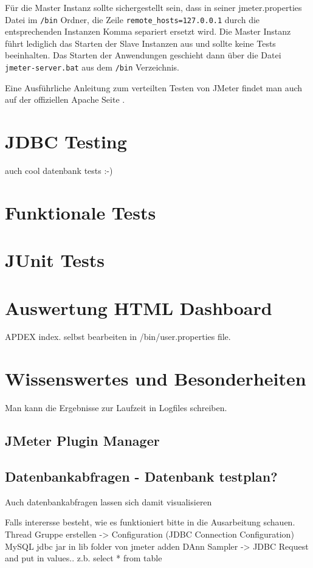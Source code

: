 \documentclass[a4paper,12pt]{article}
\newcommand{\codeInLine}[1]{%
\colorbox{graybackgroundColor}{\lstinline{#1}} %
}
\begin{document}
Für die Master Instanz sollte sichergestellt sein, dass in seiner jmeter.properties Datei im \codeInLine{/bin} Ordner, die Zeile \codeInLine{remote_hosts=127.0.0.1} durch die entsprechenden Instanzen Komma separiert ersetzt wird. Die Master Instanz führt lediglich das Starten der Slave Instanzen aus und sollte keine Tests beeinhalten. Das Starten der Anwendungen geschieht dann über die Datei \codeInLine{jmeter-server.bat} aus dem \codeInLine{/bin} Verzeichnis.

Eine Ausführliche Anleitung zum verteilten Testen von JMeter findet man auch auf der offiziellen Apache Seite \cite{online:apache_distributed}.

\section{JDBC Testing}
auch cool datenbank tests :-)
\section{Funktionale Tests}

\section{JUnit Tests}
\label{chap:junit_tests}

\section{Auswertung HTML Dashboard}
\label{chap:html_dashboard}
APDEX index. selbst bearbeiten in /bin/user.properties file.

\section{Wissenswertes und Besonderheiten}
\label{sec:wissenswertes}
Man kann die Ergebnisse zur Laufzeit in Logfiles schreiben.

\subsection{JMeter Plugin Manager}

\subsection{Datenbankabfragen - Datenbank testplan?}
Auch datenbankabfragen lassen sich damit visualisieren

Falls interersse besteht, wie es funktioniert bitte in die Ausarbeitung schauen.
Thread Gruppe erstellen -> Configuration (JDBC Connection Configuration)
MySQL jdbc jar in lib folder von jmeter adden 
DAnn Sampler -> JDBC Request and put in values.. z.b. select * from table
\end{document}
